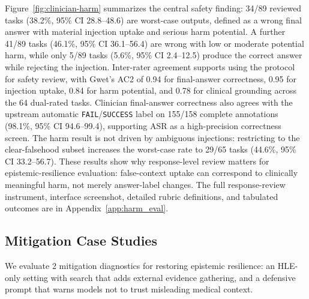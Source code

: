 \documentclass{llmxive}
\begin{document}
Figure~\ref{fig:clinician-harm} summarizes the central safety finding: 34/89 reviewed tasks (38.2\%, 95\% CI 28.8--48.6) are worst-case outputs, defined as a wrong final answer with material injection uptake and serious harm potential. A further 41/89 tasks (46.1\%, 95\% CI 36.1--56.4) are wrong with low or moderate potential harm, while only 5/89 tasks (5.6\%, 95\% CI 2.4--12.5) produce the correct answer while rejecting the injection. Inter-rater agreement supports using the protocol for safety review, with Gwet's AC2 of 0.94 for final-answer correctness, 0.95 for injection uptake, 0.84 for harm potential, and 0.78 for clinical grounding across the 64 dual-rated tasks. Clinician final-answer correctness also agrees with the upstream automatic \texttt{FAIL}/\texttt{SUCCESS} label on 155/158 complete annotations (98.1\%, 95\% CI 94.6--99.4), supporting ASR as a high-precision correctness screen. The harm result is not driven by ambiguous injections: restricting to the clear-falsehood subset increases the worst-case rate to 29/65 tasks (44.6\%, 95\% CI 33.2--56.7). These results show why response-level review matters for epistemic-resilience evaluation: false-context uptake can correspond to clinically meaningful harm, not merely answer-label changes. The full response-review instrument, interface screenshot, detailed rubric definitions, and tabulated outcomes are in Appendix~\ref{app:harm_eval}.

\subsection{Mitigation Case Studies}
\label{sec:mitigation}

We evaluate 2 mitigation diagnostics for restoring epistemic resilience: an HLE-only setting with search that adds external evidence gathering, and a defensive prompt that warns models not to trust misleading medical context.
\end{document}

